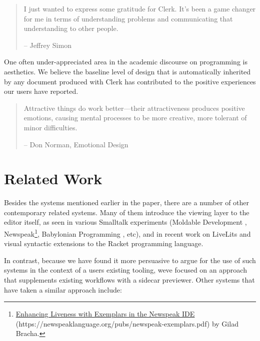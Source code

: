 \documentclass[sigconf,screen,pbalance=true]{acmart}
\begin{document}
\begin{quote}
I just wanted to express some gratitude for Clerk. It's been a game changer for me in terms of understanding problems and communicating that understanding to other people.

-- Jeffrey Simon
\end{quote}

One often under-appreciated area in the academic discourse on programming is aesthetics. We believe the baseline level of design that is automatically inherited by any document produced with Clerk has contributed to the positive experiences our users have reported.

\begin{quote}
Attractive things do work better---their attractiveness produces positive emotions, causing mental processes to be more creative, more tolerant of minor difficulties.

-- Don Norman, Emotional Design
\end{quote}

\hypertarget{related-work}{%
\section{Related Work}\label{related-work}}

Besides the systems mentioned earlier in the paper, there are a number of other contemporary related systems. Many of them introduce the viewing layer to the editor itself, as seen in various Smalltalk experiments (Moldable Development \cite{Chi__2015},  Newspeak\footnote{{\href{https://newspeaklanguage.org/pubs/newspeak-exemplars.pdf}{Enhancing Liveness with Exemplars in the Newspeak IDE} (https://newspeaklanguage.org/pubs/newspeak-exemplars.pdf)} by Gilad Bracha.},  Babylonian Programming \cite{Rauch_2019}, etc), and in recent work on LiveLits \cite{Omar_2021} and visual syntactic extensions to the Racket programming language. \cite{Andersen_2020}

In contrast, because we have found it more persuasive to argue for the use of such systems in the context of a user\textquotesingle s existing tooling, we\textquotesingle ve focused on an approach that supplements existing workflows with a sidecar previewer. Other systems that have taken a similar approach include:
\end{document}

